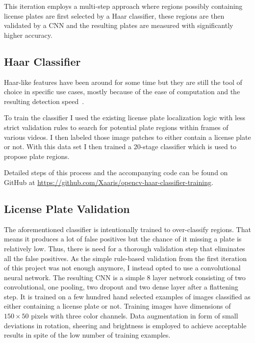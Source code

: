 This iteration employs a multi-step approach where regions possibly containing license plates are first selected by a Haar classifier, these regions are then validated by a CNN and the resulting plates are measured with significantly higher accuracy.

\subsection{Haar Classifier}

Haar-like features have been around for some time but they are still the tool of choice in specific use cases, mostly because of the ease of computation and the resulting detection speed~\cite{Viola2001}.

To train the classifier I used the existing license plate localization logic with less strict validation rules to search for potential plate regions within frames of various videos.
I then labeled those image patches to either contain a license plate or not.
With this data set I then trained a 20-stage classifier which is used to propose plate regions.

Detailed steps of this process and the accompanying code can be found on GitHub at \href{https://github.com/Xaaris/opencv-haar-classifier-training}{https://github.com/Xaaris/opencv-haar-classifier-training}.


\subsection{License Plate Validation}
The aforementioned classifier is intentionally trained to over-classify regions.
That means it produces a lot of false positives but the chance of it missing a plate is relatively low.
Thus, there is need for a thorough validation step that eliminates all the false positives.
As the simple rule-based validation from the first iteration of this project was not enough anymore, I instead opted to use a convolutional neural network.
The resulting CNN is a simple 8 layer network consisting of two convolutional, one pooling, two dropout and two dense layer after a flattening step.
It is trained on a few hundred hand selected examples of images classified as either containing a license plate or not.
Training images have dimensions of $150 \times 50$ pixels with three color channels.
Data augmentation in form of small deviations in rotation, sheering and brightness is employed to achieve acceptable results in spite of the low number of training examples.


